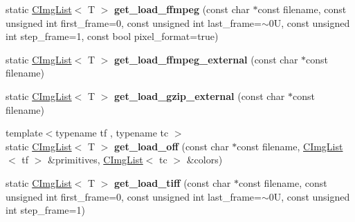 \begin{DoxyCompactItemize}
\item 
\hypertarget{structcimg__library_1_1CImgList_aec6188817de989c6355f9dcf81788f37}{
static \hyperlink{structcimg__library_1_1CImgList}{CImgList}$<$ T $>$ {\bfseries get\_\-load\_\-ffmpeg} (const char $\ast$const filename, const unsigned int first\_\-frame=0, const unsigned int last\_\-frame=$\sim$0U, const unsigned int step\_\-frame=1, const bool pixel\_\-format=true)}
\label{structcimg__library_1_1CImgList_aec6188817de989c6355f9dcf81788f37}

\item 
\hypertarget{structcimg__library_1_1CImgList_ae59117119fcf4c35eb85890c1699b037}{
static \hyperlink{structcimg__library_1_1CImgList}{CImgList}$<$ T $>$ {\bfseries get\_\-load\_\-ffmpeg\_\-external} (const char $\ast$const filename)}
\label{structcimg__library_1_1CImgList_ae59117119fcf4c35eb85890c1699b037}

\item 
\hypertarget{structcimg__library_1_1CImgList_a2afcc959c5c4408d4c1fa87f5506e472}{
static \hyperlink{structcimg__library_1_1CImgList}{CImgList}$<$ T $>$ {\bfseries get\_\-load\_\-gzip\_\-external} (const char $\ast$const filename)}
\label{structcimg__library_1_1CImgList_a2afcc959c5c4408d4c1fa87f5506e472}

\item 
\hypertarget{structcimg__library_1_1CImgList_ac9c6bcf8e6c9eaaa62c4e9adc1b753be}{
{\footnotesize template$<$typename tf , typename tc $>$ }\\static \hyperlink{structcimg__library_1_1CImgList}{CImgList}$<$ T $>$ {\bfseries get\_\-load\_\-off} (const char $\ast$const filename, \hyperlink{structcimg__library_1_1CImgList}{CImgList}$<$ tf $>$ \&primitives, \hyperlink{structcimg__library_1_1CImgList}{CImgList}$<$ tc $>$ \&colors)}
\label{structcimg__library_1_1CImgList_ac9c6bcf8e6c9eaaa62c4e9adc1b753be}

\item 
\hypertarget{structcimg__library_1_1CImgList_af43113248d9f9940a0306a0f3c17a772}{
static \hyperlink{structcimg__library_1_1CImgList}{CImgList}$<$ T $>$ {\bfseries get\_\-load\_\-tiff} (const char $\ast$const filename, const unsigned int first\_\-frame=0, const unsigned int last\_\-frame=$\sim$0U, const unsigned int step\_\-frame=1)}
\label{structcimg__library_1_1CImgList_af43113248d9f9940a0306a0f3c17a772}

\end{DoxyCompactItemize}
